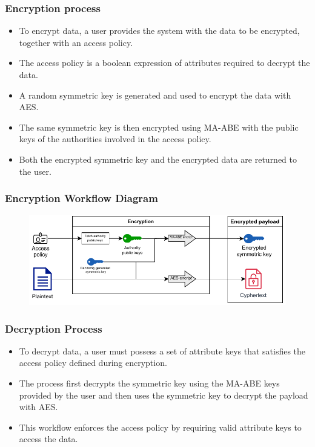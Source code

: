 \documentclass{beamer}
\begin{document}
\begin{frame}
\frametitle{Encryption process}
\begin{itemize}
\item To encrypt data, a user provides the system with the data to be encrypted, together with an access policy.
\item The access policy is a boolean expression of attributes required to decrypt the data.
\item A random symmetric key is generated and used to encrypt the data with AES.
\item The same symmetric key is then encrypted using MA-ABE with the public keys of the authorities involved in the access policy.
\item Both the encrypted symmetric key and the encrypted data are returned to the user.
\end{itemize}
\end{frame}

\begin{frame}
\frametitle{Encryption Workflow Diagram}
\begin{figure}
\includegraphics[width=\textwidth,height=0.7\textheight,keepaspectratio]{images/diagrams/encryption_diagram.pdf}
\end{figure}
\end{frame}

\begin{frame}
\frametitle{Decryption Process}
\begin{itemize}
\item To decrypt data, a user must possess a set of attribute keys that satisfies the access policy defined during encryption.
\item The process first decrypts the symmetric key using the MA-ABE keys provided by the user and then uses the symmetric key to decrypt the payload with AES.
\item This workflow enforces the access policy by requiring valid attribute keys to access the data.
\end{itemize}
\end{frame}
\end{document}
